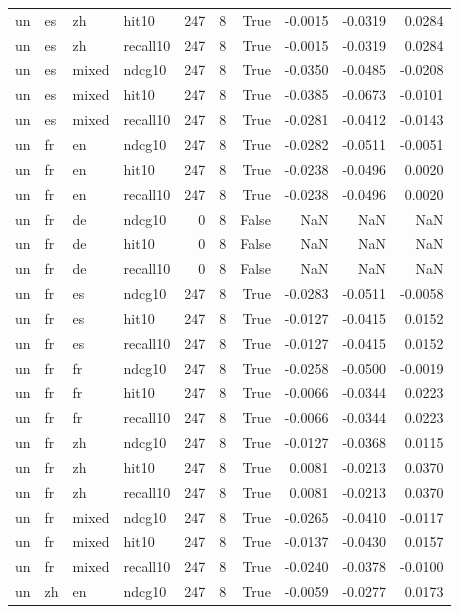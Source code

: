 \begin{tabular}{llllrrrrrr}
un & es & zh & hit10 & 247 & 8 & True & -0.0015 & -0.0319 & 0.0284 \\
un & es & zh & recall10 & 247 & 8 & True & -0.0015 & -0.0319 & 0.0284 \\
un & es & mixed & ndcg10 & 247 & 8 & True & -0.0350 & -0.0485 & -0.0208 \\
un & es & mixed & hit10 & 247 & 8 & True & -0.0385 & -0.0673 & -0.0101 \\
un & es & mixed & recall10 & 247 & 8 & True & -0.0281 & -0.0412 & -0.0143 \\
un & fr & en & ndcg10 & 247 & 8 & True & -0.0282 & -0.0511 & -0.0051 \\
un & fr & en & hit10 & 247 & 8 & True & -0.0238 & -0.0496 & 0.0020 \\
un & fr & en & recall10 & 247 & 8 & True & -0.0238 & -0.0496 & 0.0020 \\
un & fr & de & ndcg10 & 0 & 8 & False & NaN & NaN & NaN \\
un & fr & de & hit10 & 0 & 8 & False & NaN & NaN & NaN \\
un & fr & de & recall10 & 0 & 8 & False & NaN & NaN & NaN \\
un & fr & es & ndcg10 & 247 & 8 & True & -0.0283 & -0.0511 & -0.0058 \\
un & fr & es & hit10 & 247 & 8 & True & -0.0127 & -0.0415 & 0.0152 \\
un & fr & es & recall10 & 247 & 8 & True & -0.0127 & -0.0415 & 0.0152 \\
un & fr & fr & ndcg10 & 247 & 8 & True & -0.0258 & -0.0500 & -0.0019 \\
un & fr & fr & hit10 & 247 & 8 & True & -0.0066 & -0.0344 & 0.0223 \\
un & fr & fr & recall10 & 247 & 8 & True & -0.0066 & -0.0344 & 0.0223 \\
un & fr & zh & ndcg10 & 247 & 8 & True & -0.0127 & -0.0368 & 0.0115 \\
un & fr & zh & hit10 & 247 & 8 & True & 0.0081 & -0.0213 & 0.0370 \\
un & fr & zh & recall10 & 247 & 8 & True & 0.0081 & -0.0213 & 0.0370 \\
un & fr & mixed & ndcg10 & 247 & 8 & True & -0.0265 & -0.0410 & -0.0117 \\
un & fr & mixed & hit10 & 247 & 8 & True & -0.0137 & -0.0430 & 0.0157 \\
un & fr & mixed & recall10 & 247 & 8 & True & -0.0240 & -0.0378 & -0.0100 \\
un & zh & en & ndcg10 & 247 & 8 & True & -0.0059 & -0.0277 & 0.0173 \\

\end{tabular}
